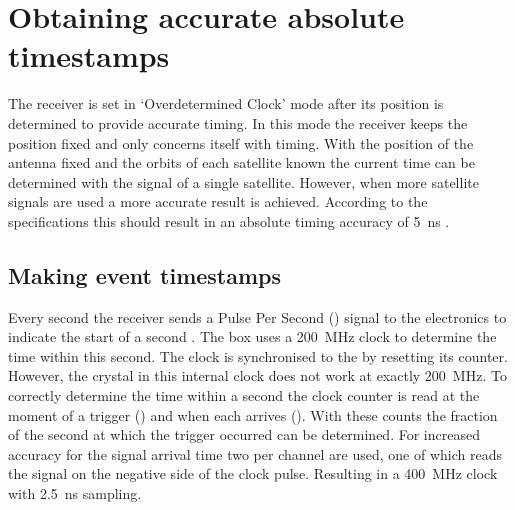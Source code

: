 \section{Obtaining accurate absolute timestamps}

The \gps receiver is set in `Overdetermined Clock' mode after its position is determined to provide accurate timing. In this mode the \gps receiver keeps the position fixed and only concerns itself with timing. With the position of the \gps antenna fixed and the orbits of each \gps satellite known the current time can be determined with the signal of a single \gps satellite. However, when more satellite signals are used a more accurate result is achieved. According to the specifications this should result in an absolute timing accuracy of \SI{5}{\ns} \cite{trimble2007resolutiont}.


\subsection{Making event timestamps}
\label{sub:gps_timestamps}

Every second the \gps receiver sends a Pulse Per Second (\pps) signal to the \hisparc electronics to indicate the start of a second \cite{verkooijen2008firmware}. The \hisparc box uses a \SI{200}{\mega\hertz} clock to determine the time within this second. The clock is synchronised to the \pps by resetting its counter. However, the crystal in this internal clock does not work at exactly \SI{200}{\mega\hertz}. To correctly determine the time within a second the clock counter is read at the moment of a trigger (\ctd) and when each \pps arrives (\ctp). With these counts the fraction of the second at which the trigger occurred can be determined. For increased accuracy for the signal arrival time two \adcs per channel are used, one of which reads the signal on the negative side of the clock pulse. Resulting in a \SI{400}{\mega\hertz} clock with \SI{2.5}{\ns} sampling.

